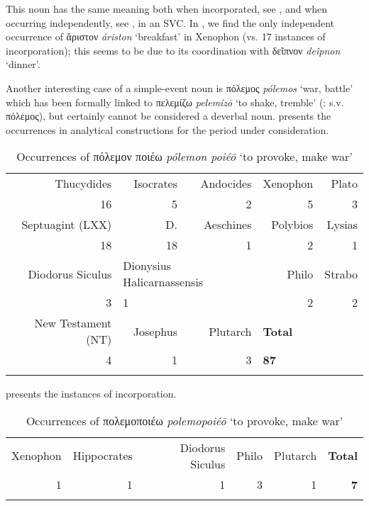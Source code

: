 \documentclass[output=paper,colorlinks,citecolor=brown]{langscibook}
\begin{document}
This noun has the same meaning both when incorporated, see , and when occurring independently, see , in an SVC. In , we find the only independent occurrence of ἄριστον \textit{áriston} `breakfast' in Xenophon (vs. 17 instances of incorporation); this seems to be due to its coordination with δεῖπνον \textit{deîpnon} `dinner'.

Another interesting case of a simple-event noun is πόλεμος \textit{pólemos} `war, battle' which has been formally linked to πελεμίζω \textit{pelemízō} `to shake, tremble' (\citealt{BeekesBeek2010}: s.v. πόλεμος), but certainly cannot be considered a deverbal noun.  presents the occurrences in analytical constructions for the period under consideration. 


\begin{table}[htb!]
	\caption{Occurrences of πόλεμον ποιέω \textit{pólemon poiéō} `to provoke, make war'}
	\label{tab:I:occurrences-polemon-poieo}
	\begin{tabular}{rrrrr}
    \lsptoprule
		Thucydides  & Isocrates & Andocides & Xenophon   & Plato \\
		16   & 5     & 2    & 5    & 3 \\
        Septuagint (LXX) & D.   & Aeschines     & Polybios & Lysias  \\
        18    & 18   & 1            & 2        & 1  \\
		Diodorus Siculus & \multicolumn{2}{l}{Dionysius Halicarnassensis}  & Philo  & Strabo \\ 
		3    & \multicolumn{2}{l}{1} & 2    & 2   \\
        New Testament (NT) & Josephus   & Plutarch & \multicolumn{2}{l}{\textbf{Total}} \\
        4   & 1    & 3    & \multicolumn{2}{l}{\textbf{87}} \\
    \lspbottomrule
	\end{tabular}
\end{table}


 presents the instances of incorporation. 


\begin{table}[htb!]
	\caption{Occurrences of πολεμοποιέω \textit{polemopoiéō} `to provoke, make war'}
	\label{tab:J:occurrences-polemopoieo}
	\begin{tabular}{rrrrrr}
    \lsptoprule
		Xenophon & Hippocrates & Diodorus Siculus & Philo & Plutarch & \textbf{Total} \\
		1  & 1   & 1    & 3   & 1    & \textbf{7}   \\
    \lspbottomrule
	\end{tabular}
\end{table}
\end{document}

